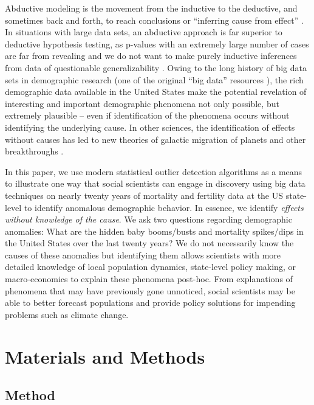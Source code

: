\documentclass[12pt]{article}
\begin{document}
Abductive modeling is the movement from the inductive to the deductive,
and sometimes back and forth, to reach conclusions
\citep{bryant2014realm} or ``inferring cause from effect''
\citep{Crowder2017}. In situations with large data sets, an abductive
approach is far superior to deductive hypothesis testing, as p-values
with an extremely large number of cases are far from revealing
\citep{head2015extent, nuzzo2014scientific} and we do not want to make
purely inductive inferences from data of questionable generalizability
\citep{ruggles2014big}. Owing to the long history of big data sets in
demographic research (one of the original ``big data'' resources
\citep{ruggles2014big}), the rich demographic data available in the
United States make the potential revelation of interesting and important
demographic phenomena not only possible, but extremely plausible -- even
if identification of the phenomena occurs without identifying the
underlying cause. In other sciences, the identification of effects
without causes has led to new theories of galactic migration of planets
and other breakthroughs \citep{gomes2005n}.

In this paper, we use modern statistical outlier detection algorithms
\citep{chen1993joint} as a means to illustrate one way that social
scientists can engage in discovery using big data techniques on nearly
twenty years of mortality and fertility data at the US state-level to
identify anomalous demographic behavior. In essence, we identify
\emph{effects without knowledge of the cause}. We ask two questions
regarding demographic anomalies: What are the hidden baby booms/busts
and mortality spikes/dips in the United States over the last twenty
years? We do not necessarily know the causes of these anomalies but
identifying them allows scientists with more detailed knowledge of local
population dynamics, state-level policy making, or macro-economics to
explain these phenomena post-hoc. From explanations of phenomena that
may have previously gone unnoticed, social scientists may be able to
better forecast populations and provide policy solutions for impending
problems such as climate change.

\hypertarget{materials-and-methods}{%
\section{Materials and Methods}\label{materials-and-methods}}

\hypertarget{method}{%
\subsection{Method}\label{method}}
\end{document}

